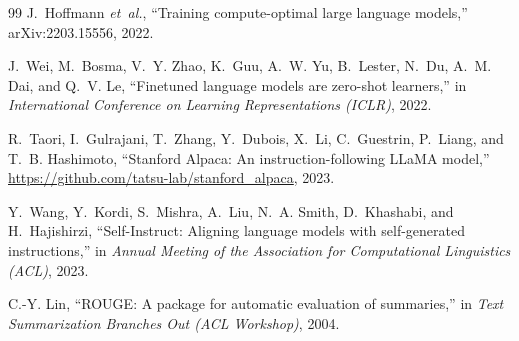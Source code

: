 \documentclass[conference]{IEEEtran}
\begin{document}
\begin{thebibliography}{99}
J.~Hoffmann \emph{et~al.}, ``Training compute-optimal large language models,'' arXiv:2203.15556, 2022.

J.~Wei, M.~Bosma, V.~Y. Zhao, K.~Guu, A.~W. Yu, B.~Lester, N.~Du, A.~M. Dai, and Q.~V. Le, ``Finetuned
language models are zero-shot learners,'' in \emph{International Conference on Learning Representations
(ICLR)}, 2022.

R.~Taori, I.~Gulrajani, T.~Zhang, Y.~Dubois, X.~Li, C.~Guestrin, P.~Liang, and T.~B. Hashimoto,
``Stanford Alpaca: An instruction-following LLaMA model,''
\url{https://github.com/tatsu-lab/stanford_alpaca}, 2023.

Y.~Wang, Y.~Kordi, S.~Mishra, A.~Liu, N.~A. Smith, D.~Khashabi, and H.~Hajishirzi, ``Self-Instruct:
Aligning language models with self-generated instructions,'' in \emph{Annual Meeting of the Association
for Computational Linguistics (ACL)}, 2023.

C.-Y. Lin, ``ROUGE: A package for automatic evaluation of summaries,'' in \emph{Text Summarization
Branches Out (ACL Workshop)}, 2004.

\end{thebibliography}
\end{document}
